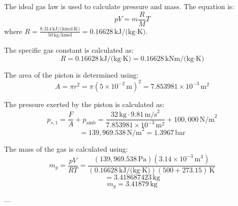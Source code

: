 The ideal gas law is used to calculate pressure and mass. The equation is:  
\[
pV = m \frac{R}{M} T
\]  
where \( R = \frac{8.314 \, \text{kJ/(kmol·K)}}{50 \, \text{kg/kmol}} = 0.16628 \, \text{kJ/(kg·K)} \).  

The specific gas constant is calculated as:  
\[
R = 0.16628 \, \text{kJ/(kg·K)} = 0.16628 \, \text{kNm/(kg·K)}
\]  

The area of the piston is determined using:  
\[
A = \pi r^2 = \pi (5 \times 10^{-2} \, \text{m})^2 = 7.853981 \times 10^{-3} \, \text{m}^2
\]  

The pressure exerted by the piston is calculated as:  
\[
p_{s,1} = \frac{F}{A} + p_{\text{amb}} = \frac{32 \, \text{kg} \cdot 9.81 \, \text{m/s}^2}{7.853981 \times 10^{-3} \, \text{m}^2} + 100,000 \, \text{N/m}^2
\]  
\[
= 139,969.538 \, \text{N/m}^2 = 1.3967 \, \text{bar}
\]  

The mass of the gas is calculated using:  
\[
m_g = \frac{pV}{RT} = \frac{(139,969.538 \, \text{Pa})(3.14 \times 10^{-3} \, \text{m}^3)}{(0.16628 \, \text{kJ/(kg·K)})(500 + 273.15) \, \text{K}}
\]  
\[
= 3.418687423 \, \text{kg}
\]  
\[
m_g = 3.41879 \, \text{kg}
\]  

---